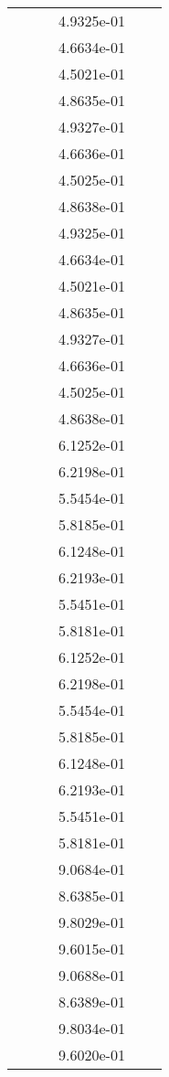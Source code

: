 \begin{xltabular}{\textwidth}{r|rS[table-format=1.3e+2]S[table-format=1.4e+2]S[table-format=1.4e+2]S[table-format=-1.5]}
&  &  & 4.9325e-01 & & \\
&  &  & 4.6634e-01 & & \\
&  &  & 4.5021e-01 & & \\
&  &  & 4.8635e-01 & & \\
&  &  & 4.9327e-01 & & \\
&  &  & 4.6636e-01 & & \\
&  &  & 4.5025e-01 & & \\
&  &  & 4.8638e-01 & & \\
&  &  & 4.9325e-01 & & \\
&  &  & 4.6634e-01 & & \\
&  &  & 4.5021e-01 & & \\
&  &  & 4.8635e-01 & & \\
&  &  & 4.9327e-01 & & \\
&  &  & 4.6636e-01 & & \\
&  &  & 4.5025e-01 & & \\
&  &  & 4.8638e-01 & & \\
&  &  & 6.1252e-01 & & \\
&  &  & 6.2198e-01 & & \\
&  &  & 5.5454e-01 & & \\
&  &  & 5.8185e-01 & & \\
&  &  & 6.1248e-01 & & \\
&  &  & 6.2193e-01 & & \\
&  &  & 5.5451e-01 & & \\
&  &  & 5.8181e-01 & & \\
&  &  & 6.1252e-01 & & \\
&  &  & 6.2198e-01 & & \\
&  &  & 5.5454e-01 & & \\
&  &  & 5.8185e-01 & & \\
&  &  & 6.1248e-01 & & \\
&  &  & 6.2193e-01 & & \\
&  &  & 5.5451e-01 & & \\
&  &  & 5.8181e-01 & & \\
&  &  & 9.0684e-01 & & \\
&  &  & 8.6385e-01 & & \\
&  &  & 9.8029e-01 & & \\
&  &  & 9.6015e-01 & & \\
&  &  & 9.0688e-01 & & \\
&  &  & 8.6389e-01 & & \\
&  &  & 9.8034e-01 & & \\
&  &  & 9.6020e-01 & & \\

\end{xltabular}
